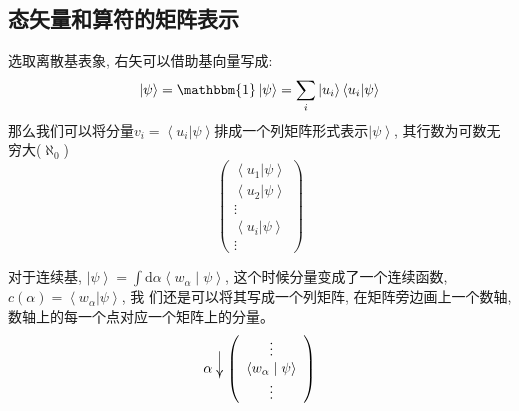 \subsection*{态矢量和算符的矩阵表示}
选取离散基表象, 右矢可以借助基向量写成:
\[\left | \psi  \right \rangle =\mathbbm{1}\left | \psi  \right \rangle =\sum\limits_{i}\left | u_i  \right \rangle \left\langle u_i|\psi  \right \rangle \]
那么我们可以将分量$v_i=\left\langle u_i|\psi  \right \rangle$排成一个列矩阵形式表示$\left|\psi\right\rangle$, 其行数为可数无穷大($\aleph_0$)
\begin{equation*}
    \begin{pmatrix}
        \left\langle u_1|\psi  \right \rangle \\
        \left\langle u_2|\psi  \right \rangle \\
        \vdots \\
        \left\langle u_i|\psi  \right \rangle\\
        \vdots 
    \end{pmatrix}
\end{equation*}

对于连续基, $\left|\psi\right\rangle=\int \mathrm{d}\alpha\left\langle w_{\alpha} \mid \psi\right\rangle$, 这个时候分量变成了一个连续函数, $c(\alpha)=\left\langle w_\alpha|\psi  \right \rangle$, 我
们还是可以将其写成一个列矩阵, 在矩阵旁边画上一个数轴, 数轴上的每一个点对应一个矩阵上的分量。
\begin{equation*}
    \alpha \longdownarrow{2.2} \left(\begin{array}{c}
    \vdots \\
    \left\langle w_{\alpha} \mid \psi\right\rangle \\
    \vdots
    \end{array}\right)
\end{equation*}

